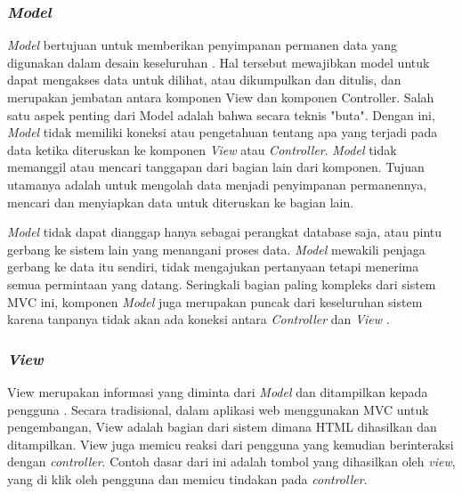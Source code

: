 \subsubsection{\textit{Model}}
\label{sec:Model}
\textit{Model} bertujuan untuk memberikan penyimpanan permanen data yang digunakan dalam desain keseluruhan \cite{codeigniter}. Hal tersebut mewajibkan model untuk dapat mengakses data untuk dilihat, atau dikumpulkan dan ditulis, dan merupakan jembatan antara komponen View dan komponen Controller. Salah satu aspek penting dari Model adalah bahwa secara teknis "buta". Dengan ini, \textit{Model} tidak memiliki koneksi atau pengetahuan tentang apa yang terjadi pada data ketika diteruskan ke komponen \textit{View} atau \textit{Controller}. \textit{Model}  tidak memanggil atau mencari tanggapan dari bagian lain dari komponen. Tujuan utamanya adalah untuk mengolah data menjadi penyimpanan permanennya, mencari dan menyiapkan data untuk diteruskan ke bagian lain. 

\textit{Model} tidak dapat dianggap hanya sebagai perangkat database saja, atau pintu gerbang ke sistem lain yang menangani proses data. \textit{Model} mewakili penjaga gerbang ke data itu sendiri, tidak mengajukan pertanyaan tetapi menerima semua permintaan yang datang. Seringkali bagian paling kompleks dari sistem MVC ini, komponen \textit{Model} juga merupakan puncak dari keseluruhan sistem karena tanpanya tidak akan ada koneksi antara \textit{Controller} dan \textit{View} .

\subsubsection{\textit{View}}
\label{sec:View} 
View merupakan informasi yang diminta dari \textit{Model} dan ditampilkan kepada pengguna \cite{codeigniter}. Secara tradisional, dalam aplikasi web menggunakan MVC untuk pengembangan, View adalah bagian dari sistem dimana HTML dihasilkan dan ditampilkan. View juga memicu reaksi dari pengguna yang kemudian berinteraksi dengan \textit{controller}. Contoh dasar dari ini adalah tombol yang dihasilkan oleh \textit{view}, yang di klik oleh pengguna dan memicu tindakan pada \textit{controller}. 

